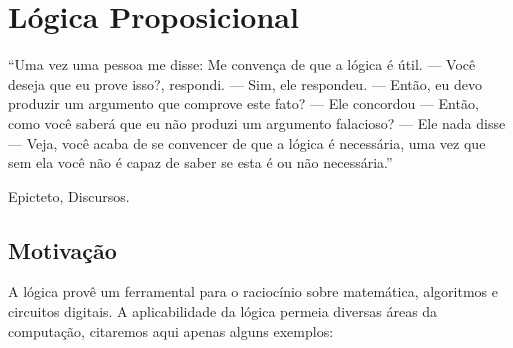 \chapter{L\'ogica Proposicional}

\epigraph{``Uma vez uma pessoa me disse: Me convença de que a lógica é
útil. --- Você deseja que eu prove isso?, respondi. --- Sim, ele
respondeu. --- Então, eu devo produzir um argumento que comprove este
fato? --- Ele concordou --- Então, como você saberá que eu não produzi
um argumento falacioso? --- Ele nada disse --- Veja, você acaba de se
convencer de que a lógica é necessária, uma vez que sem ela você não é
capaz de saber se esta é ou não necessária.''}{Epicteto, Discursos.}

\section{Motiva\c{c}\~ao}

A l\'ogica prov\^e um ferramental para o racioc\'inio sobre matem\'atica, algoritmos
e circuitos digitais. A aplicabilidade da l\'ogica permeia diversas \'areas da computa\c{c}\~ao,
citaremos aqui apenas alguns exemplos:

